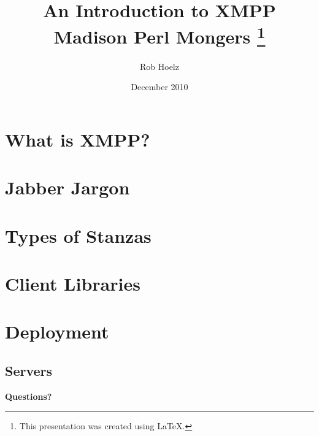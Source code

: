 \documentclass{article}
\title{
  \indent An Introduction to XMPP \newline
  Madison Perl Mongers
  \thanks{This presentation was created using \LaTeX.}}
\author{Rob Hoelz}
\date{December 2010}
\begin{document}
\maketitle

\newpage

\section*{What is XMPP?}

\newpage

\section*{Jabber Jargon}

\newpage

\section*{Types of Stanzas}

\newpage

\section*{Client Libraries}

\newpage

\section*{Deployment}

\newpage

\subsection*{Servers}

\newpage

\vspace*{\fill}
\begin{center}
\textbf{\Huge Questions?}
\end{center}
\vspace*{\fill}
\end{document}
